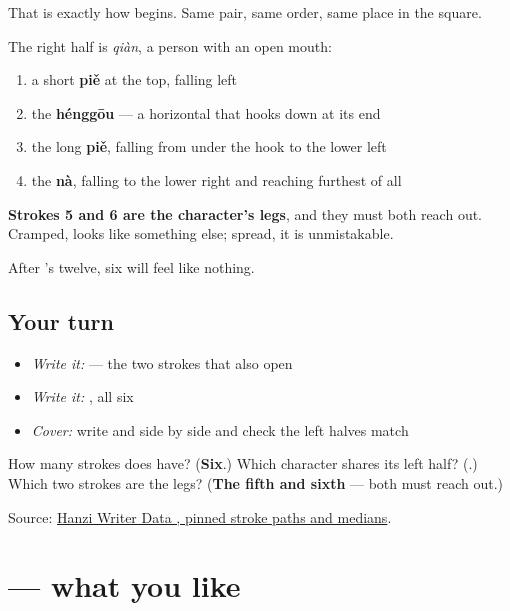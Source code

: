 That is exactly how  begins. Same pair, same order, same place in the square.

The right half is  \emph{qiàn}, a person with an open mouth:

\begin{enumerate}
\raggedright
  \item a short \textbf{piě} at the top, falling left
  \item the \textbf{hénggōu} — a horizontal that hooks down at its end
  \item the long \textbf{piě}, falling from under the hook to the lower left
  \item the \textbf{nà}, falling to the lower right and reaching furthest of all
\end{enumerate}

\textbf{Strokes 5 and 6 are the character's legs}, and they must both reach out. Cramped,  looks like something else; spread, it is unmistakable.

After 's twelve, six will feel like nothing.

\subsection*{Your turn}
\begin{itemize}
\raggedright
  \item \emph{Write it:}  — the two strokes that also open 
  \item \emph{Write it:} , all six
  \item \emph{Cover:} write  and  side by side and check the left halves match
\end{itemize}

\begin{tcolorbox}[breakable,colback=teal!4,colframe=teal!35!black,title={Before you move on}]
How many strokes does  have? (\textbf{Six}.) Which character shares its left half? (\textbf{}.) Which two strokes are the legs? (\textbf{The fifth and sixth} — both must reach out.)

Source: \href{https://raw.githubusercontent.com/chanind/hanzi-writer-data/68d10a4b21150cae5e1ebbd223eed289cf32d90c/data/\%E6\%AC\%A2.json}{Hanzi Writer Data , pinned stroke paths and medians}.
\end{tcolorbox}
\section[\texorpdfstring{\zh{喜欢} (xǐhuan)}{喜欢 (xǐhuan)}]{ — what you like}

